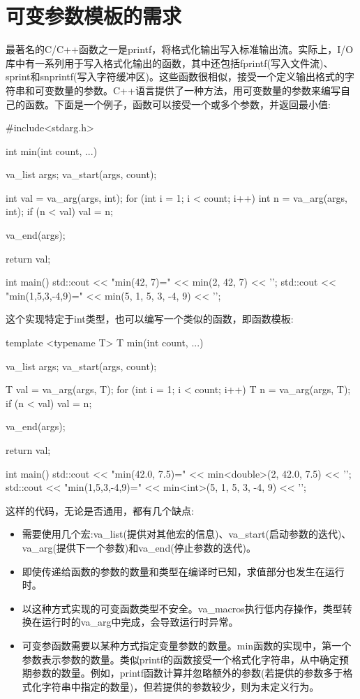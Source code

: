 \section{可变参数模板的需求}
最著名的C/C++函数之一是printf，将格式化输出写入标准输出流。实际上，I/O库中有一系列用于写入格式化输出的函数，其中还包括fprintf(写入文件流)、sprint和snprintf(写入字符缓冲区)。这些函数很相似，接受一个定义输出格式的字符串和可变数量的参数。C++语言提供了一种方法，用可变数量的参数来编写自己的函数。下面是一个例子，函数可以接受一个或多个参数，并返回最小值:

\begin{cpp}
#include<stdarg.h>

int min(int count, ...)
{
	va_list args;
	va_start(args, count);
	
	int val = va_arg(args, int);
	for (int i = 1; i < count; i++)
	{
		int n = va_arg(args, int);
		if (n < val)
			val = n;
	}

	va_end(args);
	
	return val;
}

int main()
{
	std::cout << "min(42, 7)=" << min(2, 42, 7) << '\n';
	std::cout << "min(1,5,3,-4,9)=" <<
				  min(5, 1, 5, 3, -4,
	           9) << '\n';
}
\end{cpp}

这个实现特定于int类型，也可以编写一个类似的函数，即函数模板:

\begin{cpp}
template <typename T>
T min(int count, ...)
{
	va_list args;
	va_start(args, count);
	
	T val = va_arg(args, T);
	for (int i = 1; i < count; i++)
	{
		T n = va_arg(args, T);
		if (n < val)
		val = n;
	}

	va_end(args);
	
	return val;
}

int main()
{
	std::cout << "min(42.0, 7.5)="
		      << min<double>(2, 42.0, 7.5) << '\n';
	std::cout << "min(1,5,3,-4,9)="
  	          << min<int>(5, 1, 5, 3, -4, 9) << '\n';
}
\end{cpp}

这样的代码，无论是否通用，都有几个缺点:

\begin{itemize}
\item
需要使用几个宏:va\_list(提供对其他宏的信息)、va\_start(启动参数的迭代)、va\_arg(提供下一个参数)和va\_end(停止参数的迭代)。

\item
即使传递给函数的参数的数量和类型在编译时已知，求值部分也发生在运行时。

\item
以这种方式实现的可变函数类型不安全。va\_macros执行低内存操作，类型转换在运行时的va\_arg中完成，会导致运行时异常。

\item
可变参函数需要以某种方式指定变量参数的数量。min函数的实现中，第一个参数表示参数的数量。类似printf的函数接受一个格式化字符串，从中确定预期参数的数量。例如，printf函数计算并忽略额外的参数(若提供的参数多于格式化字符串中指定的数量)，但若提供的参数较少，则为未定义行为。
\end{itemize}

